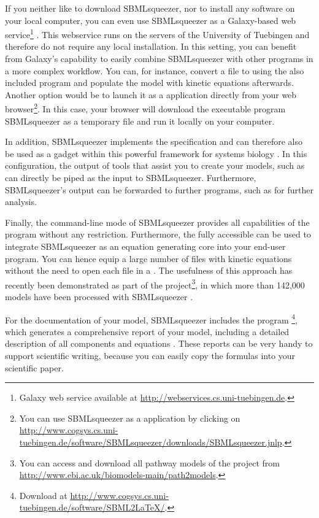 If you neither like to download SBMLsqueezer, nor to install any software on
your local computer, you can even use SBMLsqueezer as a Galaxy-based
web service\footnote{Galaxy web service available at \url{http://webservices.cs.uni-tuebingen.de}.} \citet{Goecks2010}.
This webservice runs on the servers of the University of Tuebingen and therefore do not require any local installation.
In this setting, you can benefit from Galaxy's capability to easily combine SBMLsqueezer with other programs in a more complex workflow. You can, for instance, convert a \BioPAX file to \SBML using the also included program \BioPAXSBML \citep{Buechel2012a} and populate the model with kinetic equations afterwards.
Another option would be to launch it as a \JavaWebStart application directly from your web
browser\footnote{You can use SBMLsqueezer as a \JavaWebStart application by
clicking on \url{http://www.cogsys.cs.uni-tuebingen.de/software/SBMLsqueezer/downloads/SBMLsqueezer.jnlp}.}.
In this case, your browser will download the executable program SBMLsqueezer as a temporary file and run it locally on your computer.

In addition, SBMLsqueezer implements the \Garuda specification and can therefore
also be used as a gadget within this powerful framework for systems biology
\citep{Ghosh2011}. In this configuration, the output of tools that assist you
to create your models, such as \KEGGtranslator \citep{Wrzodek2011, Wrzodek2013}
can directly be piped as the input to SBMLsqueezer. Furthermore, SBMLsqueezer's
output can be forwarded to further programs, such as \SBMLsimulator
\citep{Keller2013, Keller2014} for further analysis.

Finally, the command-line mode of SBMLsqueezer provides all capabilities of the
program without any restriction.
Furthermore, the fully accessible \API can be used
to integrate SBMLsqueezer as an equation generating core into your end-user
program.
You can hence equip a large number of files with kinetic equations without the
need to open each file in a \GUI.
The usefulness of this approach has recently been demonstrated as part of the
\pathmodels project\footnote{You can access and download all pathway models of
the \pathmodels project from \url{http://www.ebi.ac.uk/biomodels-main/path2models}.},
in which more than 142,000 \SBML models have been processed with SBMLsqueezer
\citep{Buechel2013}.

For the documentation of your model, SBMLsqueezer includes the program
\SBMLLaTeX\footnote{Download \SBMLLaTeX at \url{http://www.cogsys.cs.uni-tuebingen.de/software/SBML2LaTeX/}.},
which generates a comprehensive report of your model, including a detailed
description of all components and equations \citep{Draeger2009b, Draeger2010a}.
These reports can be very handy to support scientific writing, because you can
easily copy the formulas into your scientific paper.

